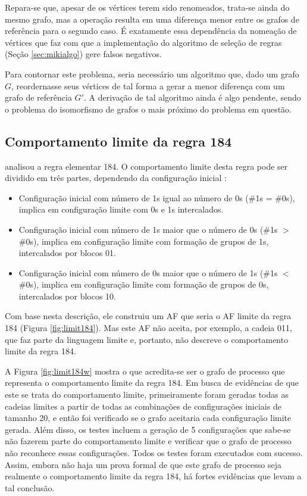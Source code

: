 \documentclass[12pt,a4paper]{article}
\begin{document}
Repara-se que, apesar de os vértices terem sido renomeados, trata-se ainda do
mesmo grafo, mas a operação resulta em uma diferença
menor entre os grafos de referência para o segundo caso. É exatamente essa
dependência da nomeação de vértices que faz com que a implementação do
algoritmo de seleção de regras (Seção \ref{sec:mikialgo}) gere falsos negativos.

Para contornar este problema, seria necessário um algoritmo que, dado
um grafo $G$, reordernasse seus vértices de tal forma a gerar a menor
diferença com um grafo de referência $G'$. A derivação de tal algoritmo
ainda é algo pendente, sendo o problema do isomorfismo de grafos o mais
próximo do problema em questão.

\subsection{Comportamento limite da regra 184}\label{sec:limit184}

 analisou a regra elementar 184. O comportamento
limite desta regra pode ser dividido em três partes, dependendo da
configuração inicial :

\begin{itemize}
\item Configuração inicial com número de 1s igual ao número de 0s
(\#1s = \#0s), implica em configuração limite com 0s e 1s
intercalados.

\item Configuração inicial com número de 1s maior que o número de 0s
(\#1s $>$ \#0s), implica em configuração limite com formação de grupos de
1s, intercalados por blocos 01.

\item Configuração inicial com número de 0s maior que o número de 1s
(\#1s $<$ \#0s), implica em configuração limite com formação de grupos
de 0s, intercalados por blocos 10.
\end{itemize}

Com base nesta descrição, ele construiu um AF que seria
o AF limite da regra 184 (Figura \ref{fig:limit184}). Mas este AF não
aceita, por exemplo, a cadeia 011, que faz parte da linguagem limite e,
portanto, não descreve o comportamento limite da regra 184.  

A Figura \ref{fig:limit184w} mostra o que acredita-se ser o grafo de processo
que representa o comportamento limite da regra 184. Em busca de evidências
de que este se trata do comportamento limite, primeiramente foram geradas
todas as cadeias limites a partir de todas as combinações de configurações
iniciais de tamanho 20, e então foi verificado se o grafo aceitaria cada
configuração limite gerada. Além disso, os testes incluem a geração de 5
configurações que sabe-se não fazerem parte do comportamento limite e verificar
que o grafo de processo não reconhece essas configurações.
Todos os testes foram executados com sucesso.
Assim, embora não haja um prova formal de que este grafo de processo seja
realmente o comportamento limite da regra 184, há fortes evidências que
levam a tal conclusão.
\end{document}
